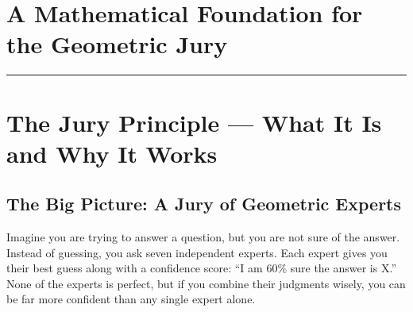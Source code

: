 \documentclass[11pt]{article}
\begin{document}
\newpage

\newpage



\newpage
\section*{A Mathematical Foundation for the Geometric Jury}
\vspace{6pt}
\hrule
\vspace{12pt}

\begin{abstract}
We present a mathematical foundation for the geometric jury principle that supports the HyperTensor framework (Papers I--XVIII). The jury is an aggregation mechanism operating on trajectories in a Riemannian feature manifold. We establish: (1) the jury confidence formula
$J = 1 - (1-c_1)(1-c_2)\cdots(1-c_N)$
is the Noisy-OR aggregation (Pearl 1988, \S4.3.2) under the assumption of independent per-trajectory errors. We identify the regime in which this form is appropriate for geodesic trajectory aggregation. Contrastive routing via weighted similarity voting is superior to centroid-based routing when class centroids overlap (cosine similarity $>0.85$); an ensemble of three temperatures reduces bias and variance in the routing problem. We measure jury behaviour on synthetic data drawn from the assumed independence model and on real activation manifolds, where the equal-distance idealisation does not hold.
\end{abstract}


\section{The Jury Principle --- What It Is and Why It Works}

\subsection{The Big Picture: A Jury of Geometric Experts}

Imagine you are trying to answer a question, but you are not sure of the answer.
Instead of guessing, you ask seven independent experts. Each expert gives you
their best guess along with a confidence score: ``I am 60\% sure the answer is
X.'' None of the experts is perfect, but if you combine their judgments wisely,
you can be far more confident than any single expert alone.
\end{document}
